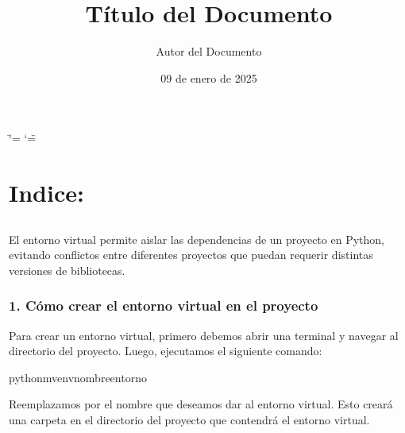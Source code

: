 \documentclass[a4paper,10pt,spanish]{sphinxmanual}
\title{Título del Documento}
\date{09 de enero de 2025}
\author{Autor del Documento}
\begin{document}
\ifdefined\shorthandoff
  \ifnum\catcode`\=\string=\active\shorthandoff{=}\fi
  \ifnum\catcode`\"=\active{}\fi
\fi

\pagestyle{empty}
\sphinxmaketitle
\pagestyle{plain}
\sphinxtableofcontents
\pagestyle{normal}
\label{\detokenize{index::doc}}



\chapter{Indice:}
\label{\detokenize{index:indice}}
\sphinxstepscope


\section{}
\label{\detokenize{configuracion_inicial/001.env:entorno-virtual}}\label{\detokenize{configuracion_inicial/001.env::doc}}
\sphinxAtStartPar
El entorno virtual permite aislar las dependencias de un proyecto en Python, evitando conflictos entre diferentes proyectos que puedan requerir distintas versiones de bibliotecas.


\subsection{1. Cómo crear el entorno virtual en el proyecto}
\label{\detokenize{configuracion_inicial/001.env:como-crear-el-entorno-virtual-en-el-proyecto}}
\sphinxAtStartPar
Para crear un entorno virtual, primero debemos abrir una terminal y navegar al directorio del proyecto. Luego, ejecutamos el siguiente comando:

\begin{sphinxVerbatim}[commandchars=\\\{\}]
python\PYGZhy{}mvenvnombre\PYGZus{}entorno
\end{sphinxVerbatim}

\sphinxAtStartPar
Reemplazamos  por el nombre que deseamos dar al entorno virtual. Esto creará una carpeta en el directorio del proyecto que contendrá el entorno virtual.
\end{document}
